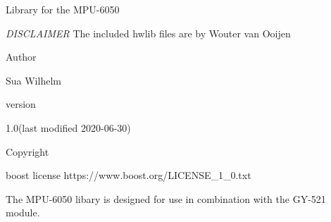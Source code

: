 Library for the M\+P\+U-\/6050

{\itshape D\+I\+S\+C\+L\+A\+I\+M\+ER} The included hwlib files are by Wouter van Ooijen

Author \begin{DoxyVerb}Sua Wilhelm
\end{DoxyVerb}


version \begin{DoxyVerb}1.0(last modified 2020-06-30)
\end{DoxyVerb}


Copyright \begin{DoxyVerb}boost license
https://www.boost.org/LICENSE_1_0.txt
\end{DoxyVerb}


The M\+P\+U-\/6050 libary is designed for use in combination with the G\+Y-\/521 module. ~\newline
 